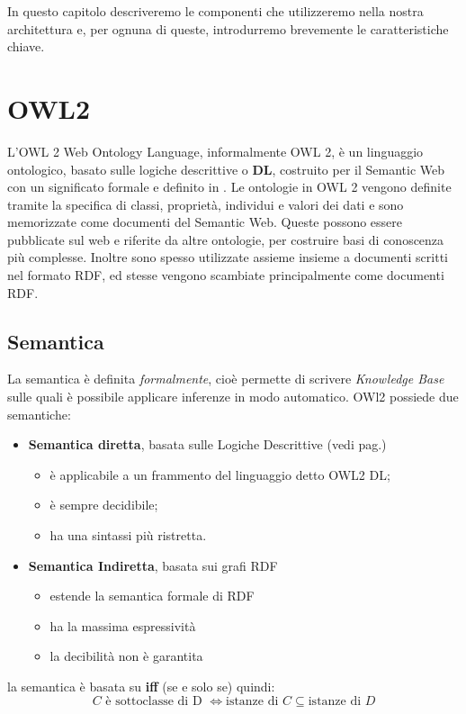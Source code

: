 In questo capitolo descriveremo le componenti che utilizzeremo nella nostra
architettura e, per ognuna di queste, introdurremo brevemente le caratteristiche chiave.

\section{OWL2}

L'OWL 2 Web Ontology Language, informalmente OWL 2, è un linguaggio ontologico, basato sulle
logiche descrittive o \textbf{DL}, costruito 
per il Semantic Web con un significato formale e definito in \cite{OWl2Primer}.
Le ontologie in OWL 2 vengono definite tramite la specifica di classi, proprietà, individui e valori dei dati e sono memorizzate come documenti del Semantic Web.
Queste possono essere pubblicate sul web e riferite da altre ontologie, per costruire basi di conoscenza più complesse. 
Inoltre sono spesso utilizzate assieme insieme a documenti scritti nel formato RDF, ed stesse vengono scambiate principalmente come documenti RDF.

\subsection{Semantica}
La semantica è definita \textit{formalmente}, cioè permette di scrivere \textit{Knowledge Base} sulle quali è possibile applicare inferenze in modo automatico.
OWl2 possiede due semantiche:
\begin{itemize}
	\item[] \textbf{Semantica diretta}, basata sulle Logiche Descrittive (vedi pag.\pageref{chap: DL})
		\begin{itemize}
			\item è applicabile a un frammento del linguaggio detto OWL2 DL;
			\item è sempre decidibile;
			\item ha una sintassi più ristretta. 
		\end{itemize}
	\item[] \textbf{Semantica Indiretta}, basata sui grafi RDF
		\begin{itemize}
			\item estende la semantica formale di RDF
			\item ha la massima espressività 
			\item la decibilità non è garantita
		\end{itemize}
\end{itemize}
la semantica è basata su \textbf{iff} (se e solo se) quindi:
\[ C \text{ è sottoclasse di D } \iff  \text{istanze di } C \subseteq \text{istanze di } D \]

